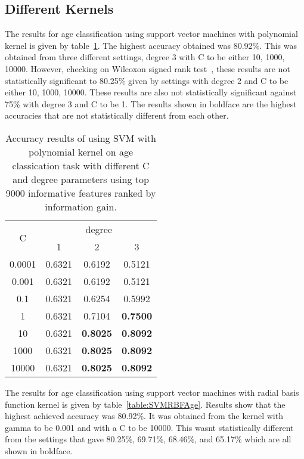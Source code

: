 \documentclass[a4paper]{llncs}
\begin{document}
\subsection{Different Kernels}
The results for age classification using support vector machines with polynomial kernel is given by table~\ref{table:SVMPolyAge}. The highest accuracy obtained was 80.92\%. This was obtained from three different settings, degree 3 with C to be either 10, 1000, 10000. However, checking on Wilcoxon signed rank test~\cite{wilcoxon1945individual}, these results are not statistically significant to 80.25\% given by settings with degree 2 and C to be either 10, 1000, 10000. These results are also not statistically significant against 75\% with degree 3 and C to be 1. The results shown in boldface are the highest accuracies that are not statistically different from each other. 

\begin{table}[!htbp]
\centering
\begin{tabular}{|c|c|c|c|}
\hline
\multirow{2}{*}{C} & \multicolumn{3}{c|}{degree}       \\ \cline{2-4} 
                   & 1      & 2      & 3               \\ \hline
0.0001             & 0.6321 & 0.6192 & 0.5121          \\ \hline
0.001              & 0.6321 & 0.6192 & 0.5121          \\ \hline
0.1                & 0.6321 & 0.6254 & 0.5992          \\ \hline
1                  & 0.6321 & 0.7104 & \textbf{0.7500} \\ \hline
10                 & 0.6321 & \textbf{0.8025} & \textbf{0.8092} \\ \hline
1000               & 0.6321 & \textbf{0.8025} & \textbf{0.8092} \\ \hline
10000              & 0.6321 & \textbf{0.8025} & \textbf{0.8092} \\ \hline
\end{tabular}
\caption{Accuracy results of using SVM with polynomial kernel on age classication task with different C and degree parameters using top 9000 informative features ranked by information gain.}
\label{table:SVMPolyAge}
\end{table}

The results for age classification using support vector machines with radial basis function kernel is given by table~\ref{table:SVMRBFAge}. Results show that the highest achieved accuracy was 80.92\%. It was obtained from the kernel with gamma to be 0.001 and with a C to be 10000. This wasnt statistically different from the settings that gave 80.25\%, 69.71\%, 68.46\%, and 65.17\% which are all shown in boldface. 
\end{document}
